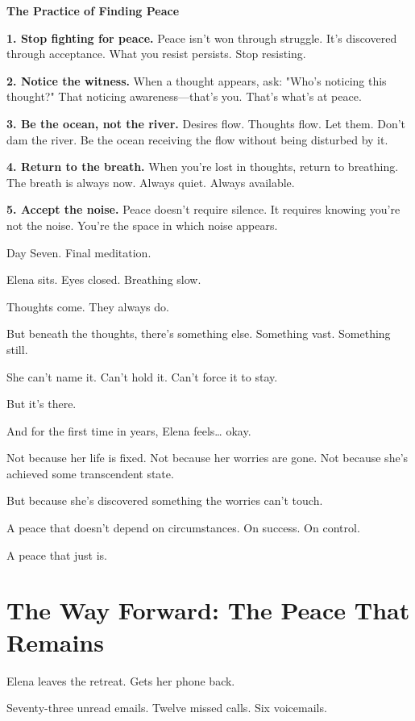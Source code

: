 \documentclass[11pt,twoside]{book}
\begin{document}
\begin{practicebox}
\textbf{The Practice of Finding Peace}

\textbf{1. Stop fighting for peace.} Peace isn't won through struggle. It's discovered through acceptance. What you resist persists. Stop resisting.

\textbf{2. Notice the witness.} When a thought appears, ask: "Who's noticing this thought?" That noticing awareness—that's you. That's what's at peace.

\textbf{3. Be the ocean, not the river.} Desires flow. Thoughts flow. Let them. Don't dam the river. Be the ocean receiving the flow without being disturbed by it.

\textbf{4. Return to the breath.} When you're lost in thoughts, return to breathing. The breath is always now. Always quiet. Always available.

\textbf{5. Accept the noise.} Peace doesn't require silence. It requires knowing you're not the noise. You're the space in which noise appears.
\end{practicebox}

Day Seven. Final meditation.

Elena sits. Eyes closed. Breathing slow.

Thoughts come. They always do.

But beneath the thoughts, there's something else. Something vast. Something still.

She can't name it. Can't hold it. Can't force it to stay.

But it's there.

And for the first time in years, Elena feels\ldots{} okay.

Not because her life is fixed. Not because her worries are gone. Not because she's achieved some transcendent state.

But because she's discovered something the worries can't touch.

A peace that doesn't depend on circumstances. On success. On control.

A peace that just is.

\section*{The Way Forward: The Peace That Remains}

Elena leaves the retreat. Gets her phone back.

Seventy-three unread emails. Twelve missed calls. Six voicemails.
\end{document}
